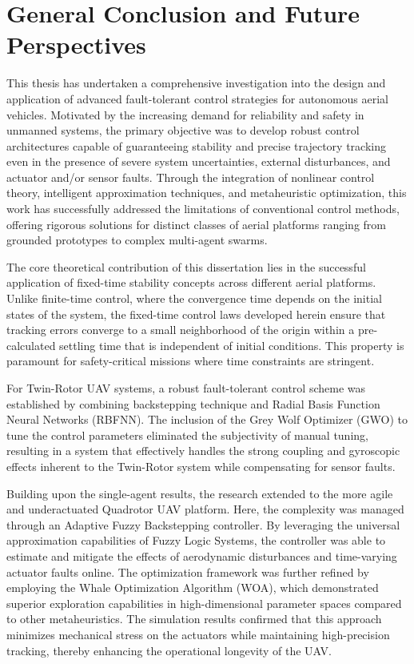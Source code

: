 \chapter{General Conclusion and Future Perspectives}
\label{chp:conclusion}

This thesis has undertaken a comprehensive investigation into the design and application of advanced fault-tolerant control strategies for autonomous aerial vehicles. Motivated by the increasing demand for reliability and safety in unmanned systems, the primary objective was to develop robust control architectures capable of guaranteeing stability and precise trajectory tracking even in the presence of severe system uncertainties, external disturbances, and actuator and/or sensor faults. Through the integration of nonlinear control theory, intelligent approximation techniques, and metaheuristic optimization, this work has successfully addressed the limitations of conventional control methods, offering rigorous solutions for distinct classes of aerial platforms ranging from grounded prototypes to complex multi-agent swarms.

The core theoretical contribution of this dissertation lies in the successful application of fixed-time stability concepts across different aerial platforms. Unlike finite-time control, where the convergence time depends on the initial states of the system, the fixed-time control laws developed herein ensure that tracking errors converge to a small neighborhood of the origin within a pre-calculated settling time that is independent of initial conditions. This property is paramount for safety-critical missions where time constraints are stringent. 

For Twin-Rotor UAV systems, a robust fault-tolerant control scheme was established by combining backstepping technique and Radial Basis Function Neural Networks (RBFNN). The inclusion of the Grey Wolf Optimizer (GWO) to tune the control parameters eliminated the subjectivity of manual tuning, resulting in a system that effectively handles the strong coupling and gyroscopic effects inherent to the Twin-Rotor system while compensating for sensor faults.

Building upon the single-agent results, the research extended to the more agile and underactuated Quadrotor UAV platform. Here, the complexity was managed through an Adaptive Fuzzy Backstepping controller. By leveraging the universal approximation capabilities of Fuzzy Logic Systems, the controller was able to estimate and mitigate the effects of aerodynamic disturbances and time-varying actuator faults online. The optimization framework was further refined by employing the Whale Optimization Algorithm (WOA), which demonstrated superior exploration capabilities in high-dimensional parameter spaces compared to other metaheuristics. The simulation results confirmed that this approach minimizes mechanical stress on the actuators while maintaining high-precision tracking, thereby enhancing the operational longevity of the UAV.

